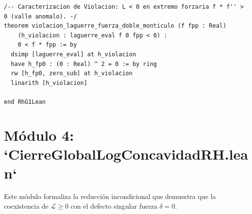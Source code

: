 \documentclass[11pt,a4paper]{article}
\theoremstyle{definition}
\theoremstyle{remark}
\begin{document}
\begin{lstlisting}[language=Lean4]
/-- Caracterizacion de Violacion: L < 0 en extremo forzaria f * f'' > 0 (valle anomalo). -/
theorem violacion_laguerre_fuerza_doble_monticulo (f fpp : Real)
    (h_violacion : laguerre_eval f 0 fpp < 0) :
    0 < f * fpp := by
  dsimp [laguerre_eval] at h_violacion
  have h_fp0 : (0 : Real) ^ 2 = 0 := by ring
  rw [h_fp0, zero_sub] at h_violacion
  linarith [h_violacion]

end RhG1Lean
\end{lstlisting}

\section{Módulo 4: `CierreGlobalLogConcavidadRH.lean`}

Este módulo formaliza la reducción incondicional que demuestra que la coexistencia de $\mathcal{L} \ge 0$ con el defecto singular fuerza $\delta = 0$.
\end{document}
